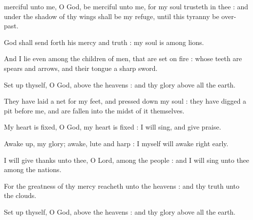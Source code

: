 
 merciful unto me, O God, be merciful unto me, for my soul trusteth in thee : and under the shadow of thy wings shall be my refuge, until this tyranny be over-past.\par
{}
God shall send forth his mercy and truth : my soul is among lions.\par
{}And I lie even among the children of men, that are set on fire : whose teeth are spears and arrows, and their tongue a sharp sword.\par
{}Set up thyself, O God, above the heavens : and thy glory above all the earth.\par
{}They have laid a net for my feet, and pressed down my soul : they have digged a pit before me, and are fallen into the midst of it themselves.\par
{}My heart is fixed, O God, my heart is fixed : I will sing, and give praise.\par
{}Awake up, my glory; awake, lute and harp : I myself will awake right early.\par
{}I will give thanks unto thee, O Lord, among the people : and I will sing unto thee among the nations.\par
{}For the greatness of thy mercy reacheth unto the heavens : and thy truth unto the clouds.\par
{}Set up thyself, O God, above the heavens : and thy glory above all the earth.\par


